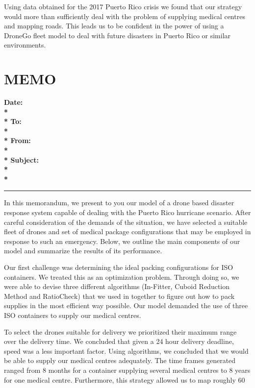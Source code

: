 \documentclass[a4paper,12pt]{article}
\begin{document}
Using data obtained for the 2017 Puerto Rico crisis we found that our strategy would more than sufficiently deal with the problem of supplying medical centres and mapping roads. This leads us to be confident in the
power of using a DroneGo fleet model to deal with future disasters in Puerto Rico or similar environments.

\newpage

\section*{\hfil MEMO\hfil}
\hrulefill

\bf{Date:} \\*\\*
\bf{To:} \\*\\*
\bf{From:} \\*\\*
\bf{Subject:} \\*\\*
{\color{black}\hrule}
In this memorandum, we present to you our model of a drone based disaster response system capable of dealing with the Puerto Rico hurricane scenario. After careful consideration of the demands of the situation, we have selected a suitable fleet of drones and set of medical package configurations that may be employed in response to such an emergency. Below, we outline the main components of our model and summarize the results of its performance.

Our first challenge was determining the ideal packing configurations for ISO containers. We treated this as an optimization problem. Through doing so, we were able to devise three different algorithms (In-Fitter, Cuboid Reduction Method and RatioCheck) that we used in together to figure out how to pack supplies in the most efficient way possible. Our model demanded the use of three ISO containers to supply our medical centres.

To select the drones suitable for delivery we prioritized their maximum range over the delivery time. We concluded that given a 24 hour delivery deadline, speed was a less important factor. Using algorithms, we concluded that we would be able to supply our medical centres adequately. The time frames generated ranged from 8 months for a container supplying several medical centres to 8 years for one medical centre. Furthermore, this strategy allowed us to map roughly 60%
\end{document}
